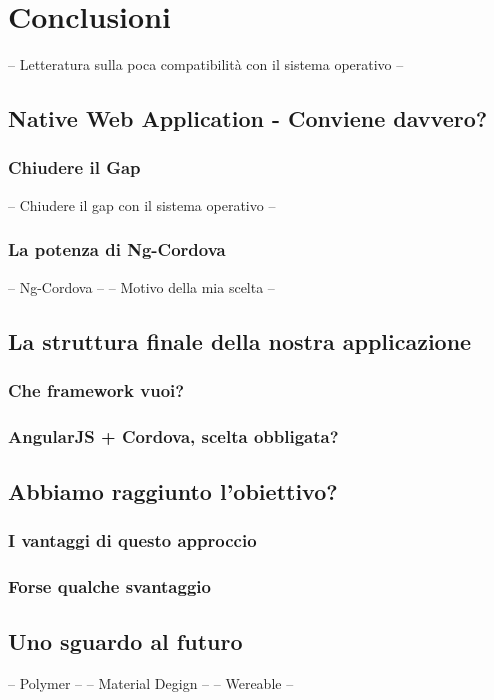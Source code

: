 \chapter{Conclusioni}
-- Letteratura sulla poca compatibilità con il sistema operativo --
\section{Native Web Application - Conviene davvero?}
\subsection{Chiudere il Gap}
-- Chiudere il gap con il sistema operativo --
\subsection{La potenza di Ng-Cordova}
-- Ng-Cordova --
-- Motivo della mia scelta --
\section{La struttura finale della nostra applicazione}
\subsection{Che framework vuoi?}
\subsection{AngularJS + Cordova, scelta obbligata?}
\section{Abbiamo raggiunto l'obiettivo?}
\subsection{I vantaggi di questo approccio}
\subsection{Forse qualche svantaggio}
\section{Uno sguardo al futuro}
-- Polymer --
-- Material Degign --
-- Wereable --